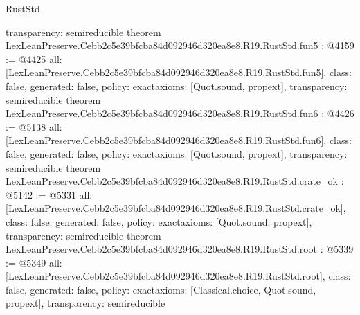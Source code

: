 \begin{lexlean}{RustStd}
\begin{coremodule}
{  transparency: semireducible
}
theorem LexLeanPreserve.Cebb2c5e39bfcba84d092946d320ea8e8.R19.RustStd.fun5 : @4159 := @4425 {
  all: [LexLeanPreserve.Cebb2c5e39bfcba84d092946d320ea8e8.R19.RustStd.fun5],
  class: false,
  generated: false,
  policy: exact{axioms: [Quot.sound, propext]},
  transparency: semireducible
}
theorem LexLeanPreserve.Cebb2c5e39bfcba84d092946d320ea8e8.R19.RustStd.fun6 : @4426 := @5138 {
  all: [LexLeanPreserve.Cebb2c5e39bfcba84d092946d320ea8e8.R19.RustStd.fun6],
  class: false,
  generated: false,
  policy: exact{axioms: [Quot.sound, propext]},
  transparency: semireducible
}
theorem LexLeanPreserve.Cebb2c5e39bfcba84d092946d320ea8e8.R19.RustStd.crate_ok : @5142 := @5331 {
  all: [LexLeanPreserve.Cebb2c5e39bfcba84d092946d320ea8e8.R19.RustStd.crate_ok],
  class: false,
  generated: false,
  policy: exact{axioms: [Quot.sound, propext]},
  transparency: semireducible
}
theorem LexLeanPreserve.Cebb2c5e39bfcba84d092946d320ea8e8.R19.RustStd.root : @5339 := @5349 {
  all: [LexLeanPreserve.Cebb2c5e39bfcba84d092946d320ea8e8.R19.RustStd.root],
  class: false,
  generated: false,
  policy: exact{axioms: [Classical.choice, Quot.sound, propext]},
  transparency: semireducible
}


\end{coremodule}
\end{lexlean}
